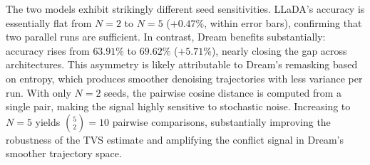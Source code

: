 \documentclass[11pt]{article}
\begin{document}
\begin{table}[h]
\centering
{}
\caption{Effect of seed count on detection performance (LR classifier, 5 random splits). LLaDA's accuracy is stable across seed counts ($\Delta = +0.47\%$), while Dream benefits substantially from additional seeds ($\Delta = +5.71\%$), suggesting the optimal seed count is dependent on architecture.}
\label{tab:ablation_seeds}
\end{table}

The two models exhibit strikingly different seed sensitivities. LLaDA's accuracy is essentially flat from $N=2$ to $N=5$ ($+0.47\%$, within error bars), confirming that two parallel runs are sufficient. In contrast, Dream benefits substantially: accuracy rises from $63.91\%$ to $69.62\%$ ($+5.71\%$), nearly closing the gap across architectures. This asymmetry is likely attributable to Dream's remasking based on entropy, which produces smoother denoising trajectories with less variance per run. With only $N=2$ seeds, the pairwise cosine distance is computed from a single pair, making the signal highly sensitive to stochastic noise. Increasing to $N=5$ yields $\binom{5}{2}=10$ pairwise comparisons, substantially improving the robustness of the TVS estimate and amplifying the conflict signal in Dream's smoother trajectory space.
\end{document}
